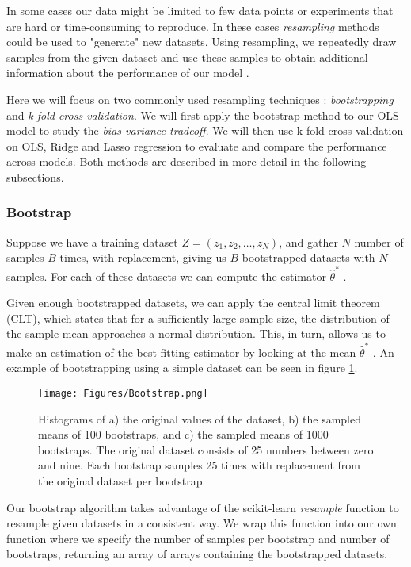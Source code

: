 \documentclass[amssymb,twocolumn,aps]{revtex4}
\begin{document}
In some cases our data might be limited to few data points or experiments that
are hard or time-consuming to reproduce. In these cases \textit{resampling}
methods could be used to "generate" new datasets. Using resampling, we repeatedly
draw samples from the given dataset and use these samples to obtain additional
information about the performance of our model \cite{fysml1} \cite{Hastie-et-al-2009}
\cite{murphy1}.

Here we will focus on two commonly used resampling techniques \cite{fysml1}:
\textit{bootstrapping} and \textit{k-fold cross-validation}. We will first apply
the bootstrap method to our OLS model to study the \textit{bias-variance tradeoff}.
We will then use k-fold cross-validation on OLS, Ridge and Lasso regression to
evaluate and compare the performance across models. Both methods are described in more detail in the following subsections.


\subsubsection{Bootstrap}
Suppose we have a training dataset $Z = (z_1, z_2, \dots, z_N)$, and gather $N$ number of samples $B$ times, with replacement, giving us $B$ bootstrapped datasets with $N$ samples. For each of these datasets we can compute the estimator $\hat{\theta}^*$ \cite{fysml1} \cite{Hastie-et-al-2009}.

Given enough bootstrapped datasets, we can apply the central limit theorem (CLT), which states that for a sufficiently large sample size, the distribution of the sample mean approaches a normal distribution. This, in turn, allows us to make an estimation of the best fitting estimator by looking at the mean $\hat{\theta}^*$ \cite{fysml1}. An example of bootstrapping using a simple dataset can be seen in figure \ref{fig:boot_ex}.


\begin{figure}[h]
    \centering
    \texttt{[image: Figures/Bootstrap.png]}
    \caption{Histograms of a) the original values of the dataset, b) the sampled means of 100 bootstraps, and c) the sampled means of 1000 bootstraps. The original dataset consists of 25 numbers between zero and nine. Each bootstrap samples 25 times with replacement from the original dataset per bootstrap.}
    \label{fig:boot_ex}
\end{figure}

Our bootstrap algorithm takes advantage of the scikit-learn \textit{resample} function \cite{scikit-learn} to resample given datasets in a consistent way. We wrap this function into our own function where we specify the number of samples per bootstrap and number of bootstraps, returning an array of arrays containing the bootstrapped datasets.
\end{document}
